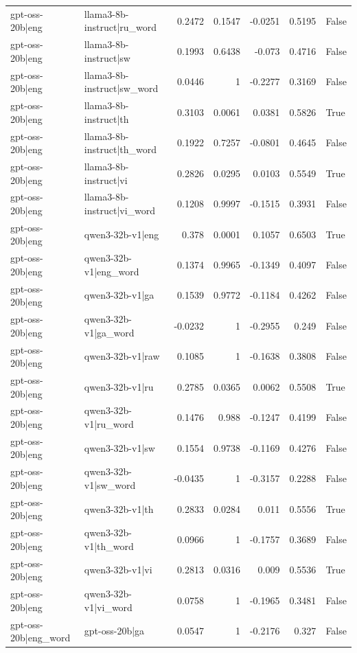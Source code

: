 \begin{table}
\begin{tabular}{l l r r r r l}
gpt-oss-20b|eng & llama3-8b-instruct|ru_word & 0.2472 & 0.1547 & -0.0251 & 0.5195 & False \\
gpt-oss-20b|eng & llama3-8b-instruct|sw & 0.1993 & 0.6438 & -0.073 & 0.4716 & False \\
gpt-oss-20b|eng & llama3-8b-instruct|sw_word & 0.0446 & 1 & -0.2277 & 0.3169 & False \\
gpt-oss-20b|eng & llama3-8b-instruct|th & 0.3103 & 0.0061 & 0.0381 & 0.5826 & True \\
gpt-oss-20b|eng & llama3-8b-instruct|th_word & 0.1922 & 0.7257 & -0.0801 & 0.4645 & False \\
gpt-oss-20b|eng & llama3-8b-instruct|vi & 0.2826 & 0.0295 & 0.0103 & 0.5549 & True \\
gpt-oss-20b|eng & llama3-8b-instruct|vi_word & 0.1208 & 0.9997 & -0.1515 & 0.3931 & False \\
gpt-oss-20b|eng & qwen3-32b-v1|eng & 0.378 & 0.0001 & 0.1057 & 0.6503 & True \\
gpt-oss-20b|eng & qwen3-32b-v1|eng_word & 0.1374 & 0.9965 & -0.1349 & 0.4097 & False \\
gpt-oss-20b|eng & qwen3-32b-v1|ga & 0.1539 & 0.9772 & -0.1184 & 0.4262 & False \\
gpt-oss-20b|eng & qwen3-32b-v1|ga_word & -0.0232 & 1 & -0.2955 & 0.249 & False \\
gpt-oss-20b|eng & qwen3-32b-v1|raw & 0.1085 & 1 & -0.1638 & 0.3808 & False \\
gpt-oss-20b|eng & qwen3-32b-v1|ru & 0.2785 & 0.0365 & 0.0062 & 0.5508 & True \\
gpt-oss-20b|eng & qwen3-32b-v1|ru_word & 0.1476 & 0.988 & -0.1247 & 0.4199 & False \\
gpt-oss-20b|eng & qwen3-32b-v1|sw & 0.1554 & 0.9738 & -0.1169 & 0.4276 & False \\
gpt-oss-20b|eng & qwen3-32b-v1|sw_word & -0.0435 & 1 & -0.3157 & 0.2288 & False \\
gpt-oss-20b|eng & qwen3-32b-v1|th & 0.2833 & 0.0284 & 0.011 & 0.5556 & True \\
gpt-oss-20b|eng & qwen3-32b-v1|th_word & 0.0966 & 1 & -0.1757 & 0.3689 & False \\
gpt-oss-20b|eng & qwen3-32b-v1|vi & 0.2813 & 0.0316 & 0.009 & 0.5536 & True \\
gpt-oss-20b|eng & qwen3-32b-v1|vi_word & 0.0758 & 1 & -0.1965 & 0.3481 & False \\
gpt-oss-20b|eng_word & gpt-oss-20b|ga & 0.0547 & 1 & -0.2176 & 0.327 & False \\

\end{tabular}
\end{table}
